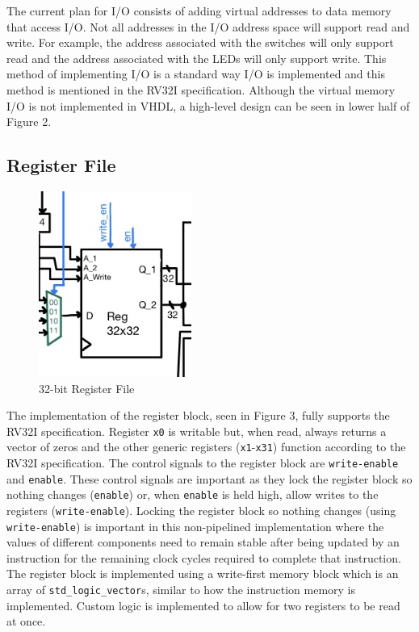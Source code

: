 \documentclass[lettersize,journal]{IEEEtran}
\begin{document}
The current plan for I/O consists of adding virtual addresses to data memory that access I/O.
Not all addresses in the I/O address space will support read and write.
For example, the address associated with the switches will only support read and the address associated with the LEDs will only support write.
This method of implementing I/O is a standard way I/O is implemented and this method is mentioned in the RV32I specification.
Although the virtual memory I/O is not implemented in VHDL, a high-level design can be seen in lower half of Figure 2.

\subsection{Register File}
\begin{figure}[!h]
    \label{fig:regblock}
    \centering
    \includegraphics[width=5cm]{REG.jpg}
    \caption{32-bit Register File}
\end{figure}
The implementation of the register block, seen in Figure 3, fully supports the RV32I specification.
Register \verb|x0| is writable but, when read, always returns a vector of zeros and the other generic registers (\verb|x1|-\verb|x31|) function according to the RV32I specification.
The control signals to the register block are \verb|write-enable| and \verb|enable|.
These control signals are important as they lock the register block so nothing changes (\verb|enable|) or, when \verb|enable| is held high, allow writes to the registers (\verb|write-enable|).
Locking the register block so nothing changes (using \verb|write-enable|) is important in this non-pipelined implementation where the values of different components need to remain
 stable after being updated by an instruction for the remaining clock cycles required to complete that instruction.
The register block is implemented using a write-first memory block which is an array of \verb|std_logic_vector|s, similar to how the instruction memory is implemented.
Custom logic is implemented to allow for two registers to be read at once.
\end{document}
